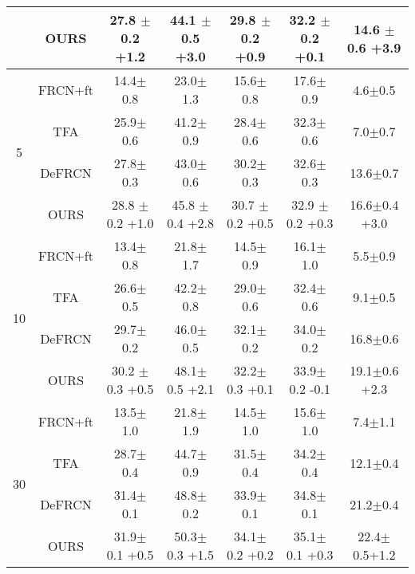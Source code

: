 \documentclass{article}
\begin{document}
\begin{table}[hbt!]
\begin{tabular}{c|c|ccc|c|c}
         & \cellcolor{gray!30} OURS & \cellcolor{gray!30} 27.8 $\pm$ 0.2 {\scriptsize \color{red}+1.2} & \cellcolor{gray!30} 44.1 $\pm$0.5 {\scriptsize \color{red}+3.0}& \cellcolor{gray!30} 29.8 $\pm$0.2 {\scriptsize \color{red}+0.9}& \cellcolor{gray!30}32.2 $\pm$0.2 {\scriptsize \color{red}+0.1}&\cellcolor{gray!30} 14.6 $\pm$0.6 {\scriptsize \color{red}+3.9}\\
         \hline
         \multirow{4}{*}{5} & FRCN+ft \cite{metarcnn} & 14.4$\pm$0.8& 23.0$\pm$1.3 &15.6$\pm$0.8 & 17.6$\pm$0.9 & 4.6$\pm$0.5 \\
         & TFA \cite{tfa} & 25.9$\pm$0.6 & 41.2$\pm$0.9 & 28.4$\pm$0.6 & 32.3$\pm$0.6 & 7.0$\pm$0.7 \\
         & DeFRCN \cite{defrcn}& 27.8$\pm$0.3 & 43.0$\pm$0.6 & 30.2$\pm$0.3 & 32.6$\pm$0.3 & 13.6$\pm$0.7 \\
         & \cellcolor{gray!30} OURS & \cellcolor{gray!30} 28.8 $\pm$0.2 {\scriptsize \color{red}+1.0}& \cellcolor{gray!30} 45.8 $\pm$0.4 {\scriptsize \color{red}+2.8}& \cellcolor{gray!30} 30.7 $\pm$0.2 {\scriptsize \color{red}+0.5}& \cellcolor{gray!30} 32.9 $\pm$0.2 {\scriptsize \color{red}+0.3}& \cellcolor{gray!30} 16.6$\pm$0.4 {\scriptsize \color{red}+3.0}\\
         \hline
         \multirow{4}{*}{10} & FRCN+ft \cite{metarcnn} & 13.4$\pm$0.8& 21.8$\pm$1.7 &14.5$\pm$0.9 & 16.1$\pm$1.0 & 5.5$\pm$0.9 \\
         & TFA \cite{tfa} & 26.6$\pm$0.5 & 42.2$\pm$0.8 & 29.0$\pm$0.6 & 32.4$\pm$0.6 & 9.1$\pm$0.5 \\
         & DeFRCN \cite{defrcn}& 29.7$\pm$0.2 & 46.0$\pm$0.5 & 32.1$\pm$0.2 & 34.0$\pm$0.2 & 16.8$\pm$0.6 \\
         & \cellcolor{gray!30} OURS & \cellcolor{gray!30} 30.2 $\pm$0.3 {\scriptsize \color{red}+0.5}& \cellcolor{gray!30} 48.1$\pm$0.5 {\scriptsize \color{red}+2.1}& \cellcolor{gray!30} 32.2$\pm$0.3 {\scriptsize \color{red}+0.1}& \cellcolor{gray!30} 33.9$\pm$0.2 {\scriptsize \color{blue}-0.1}& \cellcolor{gray!30} 19.1$\pm$0.6 {\scriptsize \color{red}+2.3}\\
         \hline
         \multirow{4}{*}{30} & FRCN+ft \cite{metarcnn} & 13.5$\pm$1.0& 21.8$\pm$1.9 &14.5$\pm$1.0 & 15.6$\pm$1.0 & 7.4$\pm$1.1 \\
         & TFA \cite{tfa} & 28.7$\pm$0.4 & 44.7$\pm$0.9 & 31.5$\pm$0.4 & 34.2$\pm$0.4 & 12.1$\pm$0.4 \\
         & DeFRCN \cite{defrcn}& 31.4$\pm$0.1 & 48.8$\pm$0.2 & 33.9$\pm$0.1 & 34.8$\pm$0.1 & 21.2$\pm$0.4 \\
         & \cellcolor{gray!30} OURS & \cellcolor{gray!30} 31.9$\pm$0.1 {\scriptsize \color{red}+0.5}& \cellcolor{gray!30} 50.3$\pm$0.3 {\scriptsize \color{red}+1.5}& \cellcolor{gray!30} 34.1$\pm$0.2 {\scriptsize \color{red}+0.2}& \cellcolor{gray!30} 35.1$\pm$0.1 {\scriptsize \color{red}+0.3}& \cellcolor{gray!30} 22.4$\pm$0.5{\scriptsize \color{red}+1.2} \\

         \bottomrule
    \end{tabular}
    
    \label{tab:gfsod_coco}
\end{table}
\newpage
\end{document}
